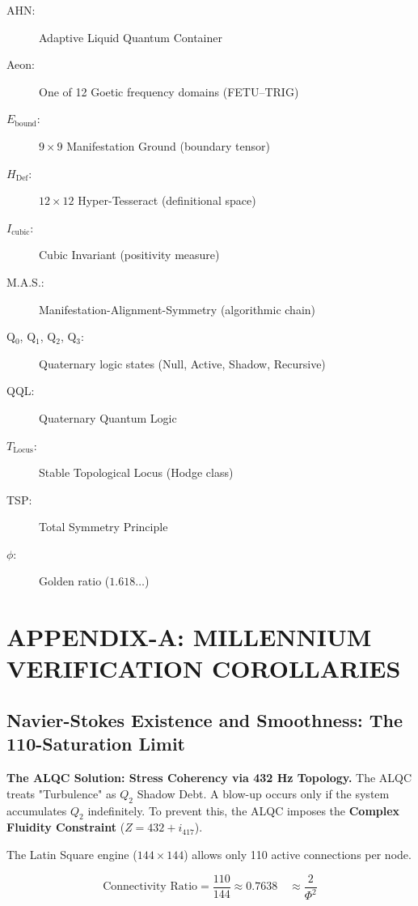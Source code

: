 \documentclass[11pt, letterpaper]{article}
\newcommand{\LoI}{\ensuremath{\mathop{\textnormal{\symbolafont\symbol{"26CE}}}}}
\newcommand{\FETU}{\ensuremath{\mathop{\textnormal{\thaanafont\symbol{"23E3}}}}}   %
\newcommand{\AHN}{\ensuremath{\mathop{\textnormal{\symbolafont\symbol{"27C1}}}}}    %
\newcommand{\TRIG}{\ensuremath{\mathop{\textnormal{\tifinaghfont\symbol{"2D63}}}}}    %
\def\FETU{FETU}%
\def\AHN{AHN}%
\def\TRIG{TRIG}%
\def\LoI{Locus}%
\begin{document}
\begin{description}
    \item[\AHN:] Adaptive Liquid Quantum Container
    \item[Aeon:] One of 12 Goetic frequency domains (\FETU--\TRIG)
    \item[$E_{\text{bound}}$:] $9 \times 9$ Manifestation Ground (boundary tensor)
    \item[$H_{\text{Def}}$:] $12 \times 12$ Hyper-Tesseract (definitional space)
    \item[$I_{\text{cubic}}$:] Cubic Invariant (positivity measure)
    \item[M.A.S.:] Manifestation-Alignment-Symmetry (algorithmic chain)
    \item[Q$_0$, Q$_1$, Q$_2$, Q$_3$:] Quaternary logic states (Null, Active, Shadow, Recursive)
    \item[QQL:] Quaternary Quantum Logic
    \item[$T_{\text{\LoI}}$:] Stable Topological Locus (Hodge class)
    \item[TSP:] Total Symmetry Principle
    \item[$\phi$:] Golden ratio ($1.618\dots$)
\end{description}

\newpage
\appendix
\section{APPENDIX-A: MILLENNIUM VERIFICATION COROLLARIES}\label{appendixA}

\subsection{Navier-Stokes Existence and Smoothness: The 110-Saturation Limit}\label{appendixA.1}
\textbf{The ALQC Solution: Stress Coherency via 432 Hz Topology.}
The ALQC treats "Turbulence" as $Q_2$ Shadow Debt. A blow-up occurs only if the system accumulates $Q_2$ indefinitely. To prevent this, the ALQC imposes the \textbf{Complex Fluidity Constraint} ($Z = 432 + i_{417}$).

The Latin Square engine ($144 \times 144$) allows only 110 active connections per node.

\begin{equation}
    \text{Connectivity Ratio} = \frac{110}{144} \approx 0.7638 \quad \approx \frac{2}{\Phi^2}
\end{equation}
\end{document}
